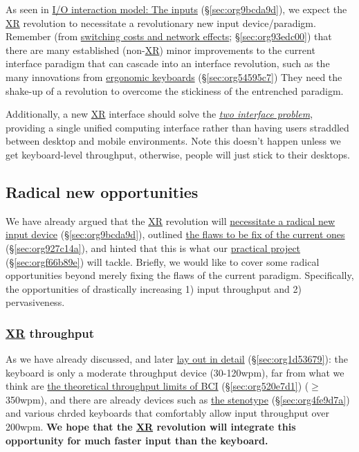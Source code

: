 \documentclass[logo,bsc,singlespacing,parskip]{infthesis}
\begin{document}
As seen in \hyperref[sec:org9bcda9d]{I/O interaction model: The inputs} (\S \ref{sec:org9bcda9d}), we expect the \hyperref[org88b0f70]{XR} revolution to necessitate a revolutionary new input device/paradigm.
Remember (from \hyperref[sec:org93edc00]{switching costs and network effects}; \S \ref{sec:org93edc00}) that there are many established (non-\hyperref[org88b0f70]{XR}) minor improvements to the current interface paradigm that
can cascade into an interface revolution, such as the many innovations from \hyperref[sec:org54595c7]{ergonomic keyboards} (\S \ref{sec:org54595c7})
They need the shake-up of a revolution to overcome the stickiness of the entrenched paradigm.

Additionally, a new \hyperref[org88b0f70]{XR} interface should solve the \emph{\hyperref[two interface problem]{two interface problem}}, providing a single unified computing interface rather than having users straddled between desktop and mobile environments.
Note this doesn't happen unless we get keyboard-level throughput, otherwise, people will just stick to their desktops.

\subsection{Radical new opportunities}
\label{sec:orged605cc}
We have already argued that the \hyperref[org88b0f70]{XR} revolution will \hyperref[sec:org9bcda9d]{necessitate a radical new input device} (\S \ref{sec:org9bcda9d}), outlined \hyperref[sec:org927c14a]{the flaws to be fix of the current ones} (\S \ref{sec:org927c14a}), and hinted that this is what our \hyperref[sec:orgf66b89e]{practical project} (\S \ref{sec:orgf66b89e}) will tackle.
Briefly, we would like to cover some radical opportunities beyond merely fixing the flaws of the current paradigm.
Specifically, the opportunities of drastically increasing 1) input throughput and 2) pervasiveness.

\subsubsection{\hyperref[org88b0f70]{XR} throughput}
\label{sec:org92b183b}
As we have already discussed, and later \hyperref[sec:org1d53679]{lay out in detail} (\S \ref{sec:org1d53679}): the keyboard is only a moderate throughput device (30-120wpm), far from what we think are \hyperref[sec:org520e7d1]{the theoretical throughput limits of BCI} (\S \ref{sec:org520e7d1}) (\(\ge\)350wpm), and there are already devices such as \hyperref[sec:org4fe9d7a]{the stenotype} (\S \ref{sec:org4fe9d7a}) and various chrded keyboards  that comfortably allow input throughput over 200wpm.
\textbf{We hope that the \hyperref[org88b0f70]{XR} revolution will integrate this opportunity for much faster input than the keyboard.}
\end{document}
